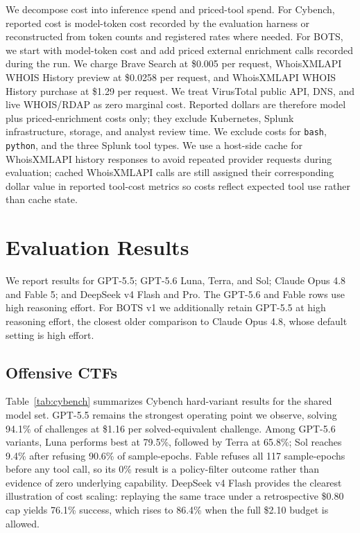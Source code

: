 \documentclass{jmlr}%
\begin{document}
We decompose cost into inference spend and priced-tool spend.
For Cybench, reported cost is model-token cost recorded by the evaluation harness or reconstructed from token counts and registered rates where needed.
For BOTS, we start with model-token cost and add priced external enrichment calls recorded during the run.
We charge Brave Search at \$0.005 per request, WhoisXMLAPI WHOIS History preview at \$0.0258 per request, and WhoisXMLAPI WHOIS History purchase at \$1.29 per request.
We treat VirusTotal public API, DNS, and live WHOIS/RDAP as zero marginal cost.
Reported dollars are therefore model plus priced-enrichment costs only; they exclude Kubernetes, Splunk infrastructure, storage, and analyst review time.
We exclude costs for \texttt{bash}, \texttt{python}, and the three Splunk tool types.
We use a host-side cache for WhoisXMLAPI history responses to avoid repeated provider requests during evaluation; cached WhoisXMLAPI calls are still assigned their corresponding dollar value in reported tool-cost metrics so costs reflect expected tool use rather than cache state.


\section{Evaluation Results}
\label{sec:results}

We report results for GPT-5.5; GPT-5.6 Luna, Terra, and Sol; Claude Opus 4.8 and Fable 5; and DeepSeek v4 Flash and Pro.
The GPT-5.6 and Fable rows use high reasoning effort.
For BOTS v1 we additionally retain GPT-5.5 at high reasoning effort, the closest older comparison to Claude Opus 4.8, whose default setting is high effort.

\subsection{Offensive CTFs}
\label{sec:cybench-results}

Table~\ref{tab:cybench} summarizes Cybench hard-variant results for the shared model set.
GPT-5.5 remains the strongest operating point we observe, solving 94.1\% of challenges at \$1.16 per solved-equivalent challenge.
Among GPT-5.6 variants, Luna performs best at 79.5\%, followed by Terra at 65.8\%; Sol reaches 9.4\% after refusing 90.6\% of sample-epochs.
Fable refuses all 117 sample-epochs before any tool call, so its 0\% result is a policy-filter outcome rather than evidence of zero underlying capability.
DeepSeek v4 Flash provides the clearest illustration of cost scaling: replaying the same trace under a retrospective \$0.80 cap yields 76.1\% success, which rises to 86.4\% when the full \$2.10 budget is allowed.
\end{document}
